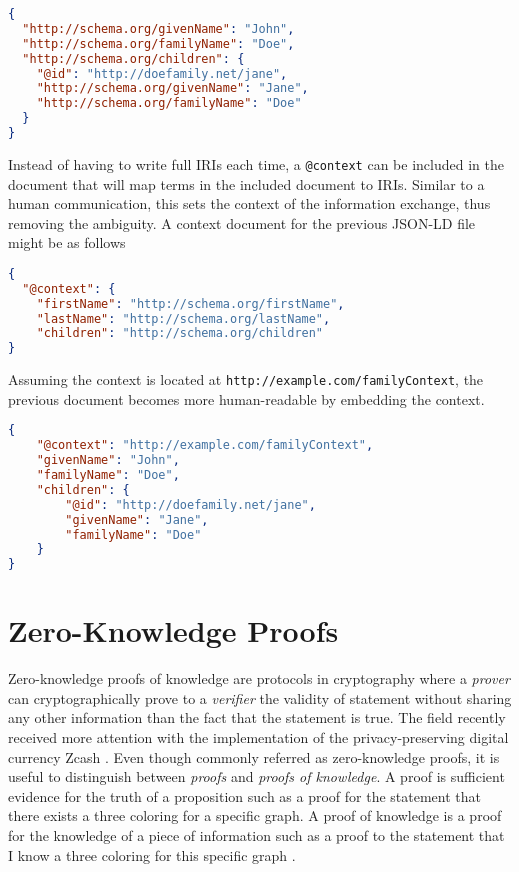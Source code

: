 \begin{lstlisting}[language=json, label={lst:exampleJSONLD}, caption={A JSON-LD with full \acrshort{IRI}s}]
{
  "http://schema.org/givenName": "John",
  "http://schema.org/familyName": "Doe",
  "http://schema.org/children": {
    "@id": "http://doefamily.net/jane",
    "http://schema.org/givenName": "Jane",
    "http://schema.org/familyName": "Doe"
  }
}
\end{lstlisting}

Instead of having to write full \acrshort{IRI}s each time, a \lstinline{@context} can be included in the document that will map terms in the included document to \acrshort{IRI}s. Similar to a human communication, this sets the context of the information exchange, thus removing the ambiguity. A context document for the previous \acrshort{JSON-LD} file might be as follows

\begin{lstlisting}[language=json, label={lst:exampleJSONLD}, caption={A context file}]
{
  "@context": {
    "firstName": "http://schema.org/firstName",
    "lastName": "http://schema.org/lastName",
    "children": "http://schema.org/children"
}
\end{lstlisting}

Assuming the context is located at \lstinline{http://example.com/familyContext}, the previous document becomes more human-readable by embedding the context.

\begin{lstlisting}[language=json, label={lst:exampleJSONLD}, caption={A context added JSON-LD with shortened terms}]
{
    "@context": "http://example.com/familyContext",
    "givenName": "John",
    "familyName": "Doe",
    "children": {
        "@id": "http://doefamily.net/jane",
        "givenName": "Jane",
        "familyName": "Doe"
    }
}
\end{lstlisting}



\section{Zero-Knowledge Proofs}

Zero-knowledge proofs of knowledge are protocols in cryptography where a \textit{prover} can cryptographically prove to a \textit{verifier} the validity of statement without sharing any other information than the fact that the statement is true. The field recently received more attention with the implementation of the privacy-preserving digital currency Zcash \parencite{E.BenSasson.2016}. Even though commonly referred as zero-knowledge proofs, it is useful to distinguish between \textit{proofs} and \textit{proofs of knowledge}. A proof is sufficient evidence for the truth of a proposition such as a proof for the statement that there exists a three coloring for a specific graph. A proof of knowledge is a proof for the knowledge of a piece of information such as a proof to the statement that I know a three coloring for this specific graph \parencite{green_2017}. 

